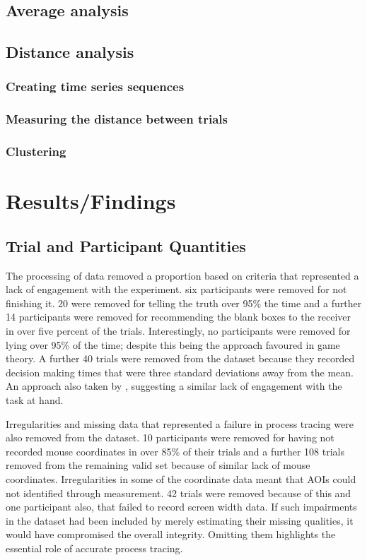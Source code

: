 \documentclass[man, floatsintext]{apa7}
\begin{document}
\subsection{Average analysis}

\subsection{Distance analysis}

\subsubsection{Creating time series sequences}

\subsubsection{Measuring the distance between trials}

\subsubsection{Clustering}


\section{Results/Findings}

\subsection{Trial and Participant Quantities}

The processing of data removed a proportion based on criteria that represented a lack of engagement with the experiment. six participants were removed for not finishing it. 20 were removed for telling the truth over 95\% the time and a further 14 participants were removed for recommending the blank boxes to the receiver in over five percent of the trials.  Interestingly, no participants were removed for lying over 95\% of the time; despite this being the approach favoured in game theory.  A further 40 trials were removed from the dataset because they recorded decision making times that were three standard deviations away from the mean. An approach also taken by \citeauthor{reeckSearchPredictsChanges2017b}, suggesting a similar lack of engagement with the task at hand.

Irregularities and missing data that represented a failure in process tracing were also removed from the dataset. 10 participants were removed for having not recorded mouse coordinates in over 85\% of their trials and a further 108 trials removed from the remaining valid set because of similar lack of mouse coordinates. Irregularities in some of the coordinate data meant that AOIs could not identified through measurement. 42 trials were removed because of this and one participant also, that failed to record screen width data. If such impairments in the dataset had been included by merely estimating their missing qualities, it would have compromised the overall integrity. Omitting them highlights the essential role of accurate process tracing.
\end{document}
